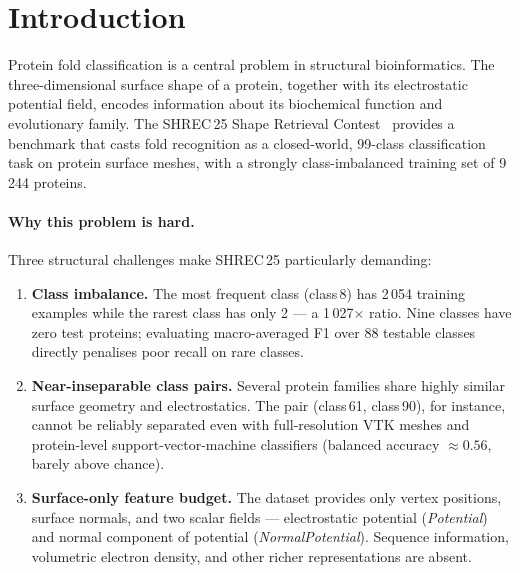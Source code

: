 \section{Introduction}
\label{sec:intro}

Protein fold classification is a central problem in structural bioinformatics.
The three-dimensional surface shape of a protein, together with its
electrostatic potential field, encodes information about its biochemical
function and evolutionary family.
The SHREC\,25 Shape Retrieval Contest~\cite{shrec25} provides a benchmark that
casts fold recognition as a closed-world, 99-class classification task on
protein surface meshes, with a strongly class-imbalanced training set of
9\,244 proteins.

\paragraph{Why this problem is hard.}
Three structural challenges make SHREC\,25 particularly demanding:
\begin{enumerate}
  \item \textbf{Class imbalance.}
        The most frequent class (class\,8) has 2\,054 training examples while
        the rarest class has only 2 --- a 1\,027$\times$ ratio.
        Nine classes have zero test proteins; evaluating macro-averaged F1 over
        88 testable classes directly penalises poor recall on rare classes.

  \item \textbf{Near-inseparable class pairs.}
        Several protein families share highly similar surface geometry and
        electrostatics.
        The pair (class\,61, class\,90), for instance, cannot be reliably
        separated even with full-resolution VTK meshes and protein-level
        support-vector-machine classifiers (balanced accuracy $\approx 0.56$,
        barely above chance).

  \item \textbf{Surface-only feature budget.}
        The dataset provides only vertex positions, surface normals, and two
        scalar fields --- electrostatic potential (\textit{Potential}) and
        normal component of potential (\textit{NormalPotential}).
        Sequence information, volumetric electron density, and other richer
        representations are absent.
\end{enumerate}

